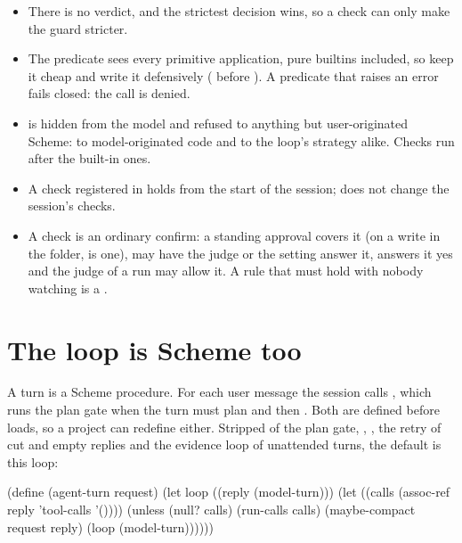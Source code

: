\begin{itemize}
  \item There is no  verdict, and the strictest decision wins,
    so a check can only make the guard stricter.
  \item The predicate sees every primitive application, pure builtins
    included, so keep it cheap and write it defensively
    ( before ). A predicate that raises
    an error fails closed: the call is denied.
  \item {} is hidden from the model and refused to
    anything but user-originated Scheme: to model-originated code and to
    the loop's strategy alike. Checks run after the built-in ones.
  \item A check registered in  holds from the start of the
    session;  does not change the session's checks.
  \item A  check is an ordinary confirm: a standing
    approval covers it (on a write in the folder,  is one),  may have the judge or the
    setting answer it,  answers it yes and the judge of a
     run may allow it. A rule that must hold with nobody
    watching is a .
\end{itemize}

\section{The loop is Scheme too}\label{sch:loop}

A turn is a Scheme procedure. For each user message the session calls
, which runs the plan gate when the turn must
plan and then . Both are defined before
 loads, so a project can redefine either. Stripped of the
plan gate, , , the retry of cut and empty replies and
the evidence loop of unattended turns, the default  is this
loop:

\begin{scm}
(define (agent-turn request)
  (let loop ((reply (model-turn)))
    (let ((calls (assoc-ref reply 'tool-calls '())))
      (unless (null? calls)
        (run-calls calls)
        (maybe-compact request reply)
        (loop (model-turn))))))
\end{scm}

